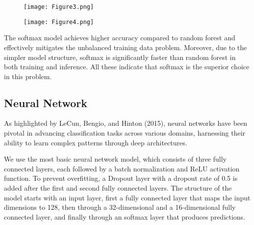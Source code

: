 \documentclass[a4paper, twocolumn]{article}
\begin{document}
\begin{figure}[ht]
\begin{center}
\texttt{[image: Figure3.png]}
\end{center}
\end{figure}

\begin{figure}[ht]
\begin{center}
\texttt{[image: Figure4.png]}
\end{center}
\end{figure}

The softmax model achieves higher accuracy compared to random forest and effectively mitigates the unbalanced training data problem. Moreover, due to the simpler model structure, softmax is significantly faster than random forest in both training and inference. All these indicate that softmax is the superior choice in this problem.

\subsection{Neural Network}

As highlighted by LeCun, Bengio, and Hinton (2015), neural networks have been pivotal in advancing classification tasks across various domains, harnessing their ability to learn complex patterns through deep architectures.

We use the most basic neural network model, which consists of three fully connected layers, each followed by a batch normalization and ReLU activation function. To prevent overfitting, a Dropout layer with a dropout rate of 0.5 is added after the first and second fully connected layers. The structure of the model starts with an input layer, first a fully connected layer that maps the input dimensions to 128, then through a 32-dimensional and a 16-dimensional fully connected layer, and finally through an softmax layer that produces predictions.
\end{document}
